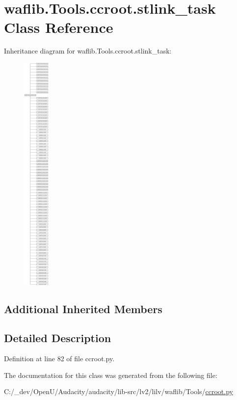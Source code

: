 \hypertarget{classwaflib_1_1_tools_1_1ccroot_1_1stlink__task}{}\section{waflib.\+Tools.\+ccroot.\+stlink\+\_\+task Class Reference}
\label{classwaflib_1_1_tools_1_1ccroot_1_1stlink__task}
Inheritance diagram for waflib.\+Tools.\+ccroot.\+stlink\+\_\+task\+:\begin{figure}[H]
\begin{center}
\leavevmode
\includegraphics[height=12.000000cm]{classwaflib_1_1_tools_1_1ccroot_1_1stlink__task}
\end{center}
\end{figure}
\subsection*{Additional Inherited Members}


\subsection{Detailed Description}


Definition at line 82 of file ccroot.\+py.



The documentation for this class was generated from the following file\+:\begin{DoxyCompactItemize}
\item 
C\+:/\+\_\+dev/\+Open\+U/\+Audacity/audacity/lib-\/src/lv2/lilv/waflib/\+Tools/\hyperlink{lilv_2waflib_2_tools_2ccroot_8py}{ccroot.\+py}\end{DoxyCompactItemize}
